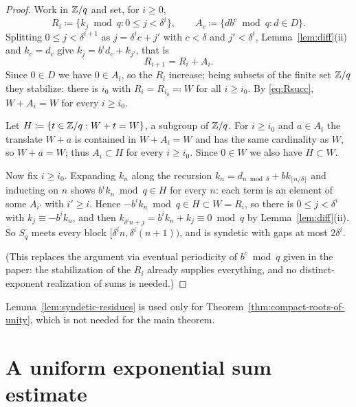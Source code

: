 \begin{proof}
  \leanok
  Work in $\mathbb{Z}/q$ and set, for $i \geq 0$,
  \[
    R_i \coloneqq \{ k_j \bmod q : 0 \leq j < \delta^i \}, \qquad
    A_c \coloneqq \{ d b^c \bmod q : d \in D \} .
  \]
  Splitting $0 \leq j < \delta^{i+1}$ as $j = \delta^i c + j'$ with $c < \delta$ and
  $j' < \delta^i$, Lemma~\ref{lem:diff}(ii) and $k_c = d_c$ give
  $k_j = b^i d_c + k_{j'}$, that is
  \begin{equation}
    \label{eq:Rsucc}
    R_{i+1} = R_i + A_i .
  \end{equation}
  Since $0 \in D$ we have $0 \in A_i$, so the $R_i$ increase; being subsets of the finite set
  $\mathbb{Z}/q$ they stabilize: there is $i_0$ with $R_i = R_{i_0} \eqqcolon W$ for all $i \geq i_0$.
  By \eqref{eq:Rsucc}, $W + A_i = W$ for every $i \geq i_0$.

  Let $H \coloneqq \{ t \in \mathbb{Z}/q : W + t = W \}$, a subgroup of $\mathbb{Z}/q$.  For $i \geq i_0$ and
  $a \in A_i$ the translate $W + a$ is contained in $W + A_i = W$ and has the same cardinality
  as $W$, so $W + a = W$; thus $A_i \subset H$ for every $i \geq i_0$.  Since $0 \in W$ we also
  have $H \subset W$.

  Now fix $i \geq i_0$.  Expanding $k_n$ along the recursion $k_n = d_{n \bmod \delta} + b
  k_{\lfloor n/\delta \rfloor}$ and inducting on $n$ shows $b^i k_n \bmod q \in H$ for every
  $n$: each term is an element of some $A_{i'}$ with $i' \geq i$.  Hence
  $-b^i k_n \bmod q \in H \subset W = R_i$, so there is $0 \leq j < \delta^i$ with
  $k_j \equiv -b^i k_n$, and then $k_{\delta^i n + j} = b^i k_n + k_j \equiv 0 \bmod q$ by
  Lemma~\ref{lem:diff}(ii).  So $S_q$ meets every block $[\delta^i n, \delta^i(n+1))$, and is
  syndetic with gaps at most $2 \delta^i$.

  (This replaces the argument via eventual periodicity of $b^c \bmod q$ given in the paper:
  the stabilization of the $R_i$ already supplies everything, and no distinct-exponent
  realization of sums is needed.)
\end{proof}

\begin{remark}
  Lemma~\ref{lem:syndetic-residues} is used only for
  Theorem~\ref{thm:compact-roots-of-unity}, which is not needed for the main theorem.
\end{remark}

\section{A uniform exponential sum estimate}

